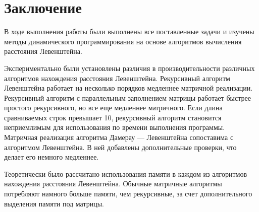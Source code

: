 \chapter*{Заключение}

В ходе выполнения работы были выполнены все поставленные задачи и изучены методы динамического программирования на основе алгоритмов вычисления расстояния Левенштейна.

Экспериментально были установлены различия в производительности различных алгоритмов нахождения расстояния Левенштейна. Рекурсивный алгоритм Левенштейна работает на несколько порядков медленнее матричной реализации. Рекурсивный алгоритм с параллельным заполнением матрицы работает быстрее простого рекурсивного, но все еще медленнее матричного. Если длина сравниваемых строк превышает 10, рекурсивный алгоритм становится неприемлимым для использования по времени выполнения программы. Матричная реализация алгоритма Дамерау — Левенштейна сопоставима с алгоритмом Левенштейна. В ней добавлены дополнительные проверки, что делает его немного медленнее.

Теоретически было рассчитано использования памяти в каждом из алгоритмов нахождения расстояния Левенштейна. Обычные матричные алгоритмы потребляют намного больше памяти, чем рекурсивные, за счет дополнительного выделения памяти под матрицы.
